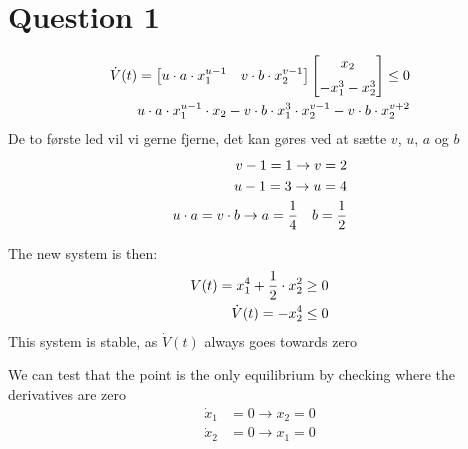 \chapter{Question 1}

\begin{equation}
\begin{split}
        \dot{V}(t) = 
        \begin{bmatrix} 
        u \cdot a \cdot x_{1}^{u-1}  & v \cdot b \cdot x_{2}^{v-1} 
        \end{bmatrix}
        \begin{bmatrix} 
        x_2 \\[2mm]
        -x_{1}^{3} - x_{2}^3 
        \end{bmatrix}
        \leq 0 \\
        u \cdot a \cdot x_{1}^{u-1} \cdot x_2 - v \cdot b \cdot x_{1}^{3} \cdot x_{2}^{v-1} - v \cdot b \cdot x_{2}^{v+2}
\end{split}
\end{equation}
De to første led vil vi gerne fjerne, det kan gøres ved at sætte $v$, $u$, $a$ og $b$
\begin{equation}
\begin{split}
        v-1 = 1 \rightarrow v=2 \\
        u-1 = 3 \rightarrow u=4 \\
        u \cdot a = v \cdot b \rightarrow a=\frac{1}{4} \quad b=\frac{1}{2}
\end{split}
\end{equation}

The new system is then:
\begin{equation}
        \begin{split}
                V(t) = x_{1}^{4} + \frac{1}{2} \cdot x_{2}^{2} \geq 0 \\
                \dot{V}(t) = -x_{2}^{4} \leq 0
        \end{split}
\end{equation}
This system is stable, as $\dot{V}(t)$ always goes towards zero

We can test that the point is the only equilibrium by checking where the derivatives are zero
\begin{equation}
        \begin{split}
                \dot{x}_1 &= 0 \rightarrow x_2 = 0 \\
                \dot{x}_2 &= 0 \rightarrow x_1 = 0
        \end{split}
\end{equation}